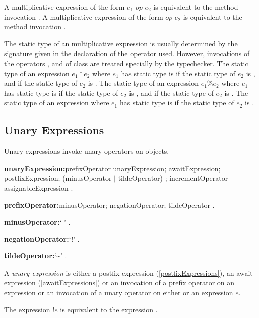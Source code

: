 \documentclass{article}
\begin{document}
\LMHash{}
A multiplicative expression of the form $e_1$ $op$ $e_2$ is equivalent to the method invocation .
A multiplicative expression of the form \SUPER{} $op$ $e_2$ is equivalent to the method invocation .

\LMHash{}
The static type of an multiplicative expression is usually determined by the signature given in the declaration of the operator used.
However, invocations of the operators \code{*}, \code{\%} and \code{\~{}/} of class  are treated specially by the typechecker.
The static type of an expression $e_1 * e_2$ where $e_1$ has static type  is  if the static type of $e_2$ is , and  if the static type of $e_2$ is .
The static type of an expression $e_1 \% e_2$ where $e_1$ has static type  is  if the static type of $e_2$ is , and  if the static type of $e_2$ is .
The static type of an expression  where $e_1$ has static type  is  if the static type of $e_2$ is .


\subsection{Unary Expressions}

\LMHash{}
Unary expressions invoke unary operators on objects.

\begin{grammar}
{\bf unaryExpression:}prefixOperator unaryExpression;
  awaitExpression;
  postfixExpression;
  (minusOperator $|$ tildeOperator) \SUPER{};
  incrementOperator assignableExpression
  .

{\bf prefixOperator:}minusOperator;
  negationOperator;
  tildeOperator
  .

{\bf minusOperator:}`-'
  .

{\bf negationOperator:}`!'
  .

{\bf tildeOperator:}`\~{}'
  .
\end{grammar}

\LMHash{}
A {\em unary expression} is either a postfix expression (\ref{postfixExpressions}), an await expression (\ref{awaitExpressions}) or an invocation of a prefix operator on an expression or an invocation of a unary operator on either \SUPER{} or an expression $e$.

\LMHash{}
The expression $!e$ is equivalent to the expression .
\end{document}
